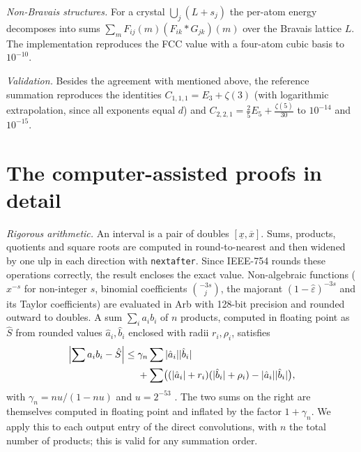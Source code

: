 \documentclass[10pt,twocolumn,a4paper]{article}
\theoremstyle{definition}
\begin{document}
\smallskip\noindent\emph{Non-Bravais structures.} For a crystal $\bigcup_j(L+s_j)$ the per-atom energy decomposes into sums $\sum_mF_{ij}(m)(F_{ik}*G_{jk})(m)$ over the Bravais lattice $L$. The implementation reproduces the FCC value with a four-atom cubic basis to $10^{-10}$.

\smallskip\noindent\emph{Validation.} Besides the agreement with \cite{BuchheitRupp,RoblesNavarro} mentioned above, the reference summation reproduces the identities $C_{1,1,1}=E_3+\zeta(3)$ (with logarithmic extrapolation, since all exponents equal $d$) and $C_{2,2,1}=\frac25E_5+\frac{\zeta(5)}{30}$ \cite{DGV} to $10^{-14}$ and $10^{-15}$.


\section{The computer-assisted proofs in detail}\label{app:bnb}
\noindent\emph{Rigorous arithmetic.} An interval is a pair of doubles $[\underline x,\overline x]$. Sums, products, quotients and square roots are computed in round-to-nearest and then widened by one ulp in each direction with \texttt{nextafter}. Since IEEE-754 rounds these operations correctly, the result encloses the exact value. Non-algebraic functions ($x^{-s}$ for non-integer $s$, binomial coefficients $\binom{-3s}{j}$, the majorant $(1-\hat\varepsilon)^{-3s}$ and its Taylor coefficients) are evaluated in Arb \cite{Arb} with 128-bit precision and rounded outward to doubles. A sum $\sum_{i}a_ib_i$ of $n$ products, computed in floating point as $\hat S$ from rounded values $\hat a_i,\hat b_i$ enclosed with radii $r_i,\rho_i$, satisfies
\[
\begin{aligned}\Bigl|\sum a_ib_i-\hat S\Bigr|\le{}&\gamma_n\sum|\hat a_i||\hat b_i|\\&+\sum\bigl((|\hat a_i|+r_i)(|\hat b_i|+\rho_i)-|\hat a_i||\hat b_i|\bigr),\end{aligned}
\]
with $\gamma_n=nu/(1-nu)$ and $u=2^{-53}$ \cite{Higham}. The two sums on the right are themselves computed in floating point and inflated by the factor $1+\gamma_n$. We apply this to each output entry of the direct convolutions, with $n$ the total number of products; this is valid for any summation order.
\end{document}

